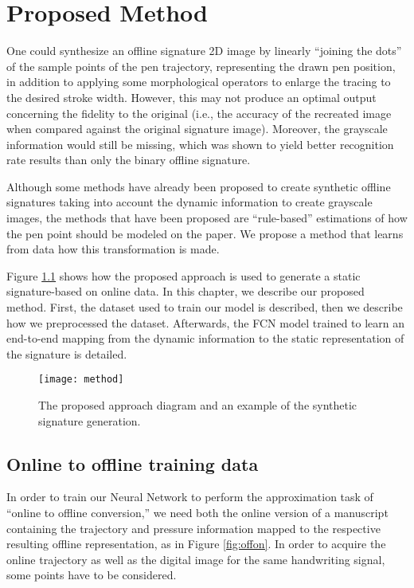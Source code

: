 
\chapter{Proposed Method}\label{ch:method}


One could synthesize an offline signature 2D image by linearly ``joining the dots''  of the sample points of the pen trajectory, representing the drawn pen position, in addition to applying some morphological operators to enlarge the tracing to the desired stroke width. However, this may not produce an optimal output concerning the fidelity to the original (i.e., the accuracy of the recreated image when compared against the original signature image). Moreover, the grayscale information would still be missing, which was shown \cite{vargas2010off} to yield better recognition rate results than only the binary offline signature.

Although some methods have already been proposed to create synthetic offline signatures taking into account the dynamic information to create grayscale images, the methods that have been proposed are ``rule-based'' estimations of how the pen point should be modeled on the paper. We propose a method that learns from data how this transformation is made. 
 
Figure \ref{fig_approach} shows how the proposed approach is used to generate a static signature-based on online data. In this chapter, we describe our proposed method. First, the dataset used to train our model is described, then we describe how we preprocessed the dataset. Afterwards, the FCN model trained to learn an end-to-end mapping from the dynamic information to the static representation of the signature is detailed.

\begin{figure}[!htb]
\centering
\texttt{[image: method]}
\caption{The proposed approach diagram and an example of the synthetic signature generation.}
\label{fig_approach}
\end{figure}

\section{Online to offline training data}
In order to train our Neural Network to perform the approximation task of ``online to offline conversion,'' we need both the online version of a manuscript containing the trajectory and pressure information mapped to the respective resulting offline representation, as in Figure \ref{fig:offon}. In order to acquire the online trajectory as well as the digital image for the same handwriting signal, some points have to be considered.

